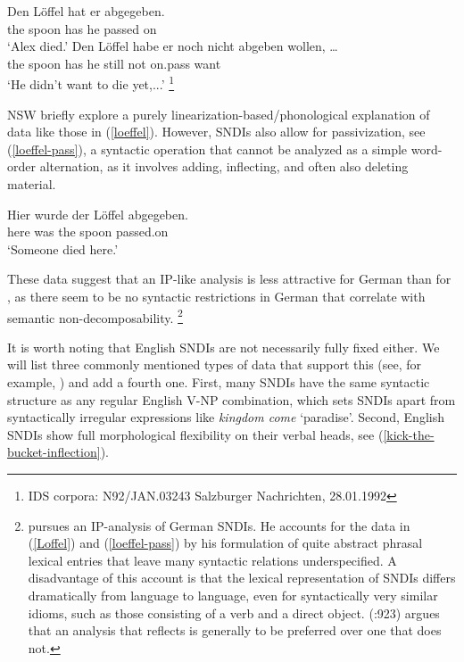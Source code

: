 \documentclass[output=paper]{langsci/langscibook}
\begin{document}
\ea
\ea\label{loeffel-vf0}
\gll Den L\"offel hat er abgegeben. \\
the spoon has he {passed on}\\
\glt `Alex died.'\label{loeffel-vf}
\ex
\gll Den L\"offel habe er noch nicht abgeben wollen, \ldots\\
the spoon has he still not on.pass want\\
\glt `He didn't want to die yet,...'%
\footnote{IDS corpora: N92/JAN.03243 Salzburger Nachrichten, 28.01.1992}\label{loeffel-vf1}
\z
\z

NSW briefly explore a purely linearization-based/phonological explanation of data like those in (\ref{loeffel}). However,   SNDIs also allow for  passivization, see (\ref{loeffel-pass}), a syntactic operation that cannot be analyzed as a simple word-order alternation, as it involves adding, inflecting, and often also deleting material.

\ea
\gll Hier wurde der L\"offel abgegeben. \\
here was the spoon passed.on \\
\glt `Someone died here.' \label{loeffel-pass}
\z

These data suggest that an IP-like analysis is less attractive for German than for , as there seem to be no syntactic restrictions in German that correlate with  semantic non-decomposability.%
\footnote{\cite{Soehn:diss} pursues an IP-analysis of  German SNDIs. He accounts for the data in (\ref{Loffel}) and (\ref{loeffel-pass}) by his formulation of quite abstract phrasal lexical entries that leave many syntactic relations  underspecified. A disadvantage of this account is that the lexical representation of SNDIs differs dramatically from language to language, even for syntactically very similar idioms, such as those consisting of a verb and a direct object. \citeauthor{Mueller:13Unifying} (\citeyear{Mueller:13Unifying}:923) argues that an analysis that reflects  is generally to be preferred over one that does not.}

It is worth noting that English SNDIs are not necessarily fully fixed either. We will list three commonly mentioned types of data that support this (see, for example, \citealt{Baldwin2010}) and add a fourth one.
First, many  SNDIs have the same syntactic structure as any regular English V-NP combination, which sets SNDIs apart from syntactically irregular expressions like \textit{kingdom come} `paradise'. Second, English SNDIs show full morphological  flexibility on their verbal heads, see (\ref{kick-the-bucket-inflection}).
\end{document}
